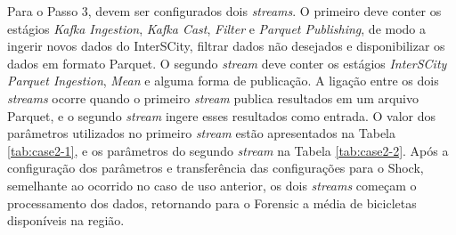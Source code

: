 Para o Passo 3, devem ser configurados dois \textit{streams}. O primeiro deve
conter os estágios \textit{Kafka Ingestion}, \textit{Kafka Cast},
\textit{Filter} e \textit{Parquet Publishing}, de modo a ingerir novos dados
do InterSCity, filtrar dados não desejados e disponibilizar os dados em formato
Parquet. O segundo \textit{stream} deve conter os estágios
\textit{InterSCity Parquet Ingestion}, \textit{Mean} e alguma forma de
publicação. A ligação entre os dois \textit{streams} ocorre quando o primeiro
\textit{stream} publica resultados em um arquivo Parquet, e o segundo
\textit{stream} ingere esses resultados como entrada. O valor dos parâmetros
utilizados no primeiro \textit{stream} estão apresentados na Tabela
\ref{tab:case2-1}, e os parâmetros do segundo \textit{stream} na Tabela
\ref{tab:case2-2}. Após a configuração dos parâmetros e transferência das
configurações para o Shock, semelhante ao ocorrido no caso de uso anterior,
os dois \textit{streams} começam o processamento dos dados, retornando para o
Forensic a média de bicicletas disponíveis na região.
